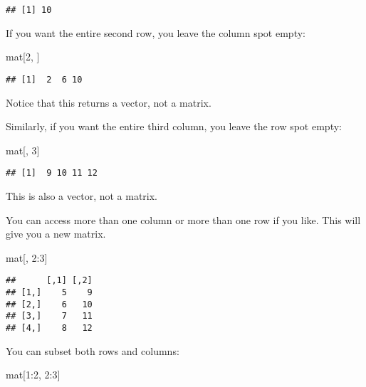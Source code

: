 \documentclass[
]{article}
\newenvironment{Shaded}{\begin{snugshade}}{\end{snugshade}}
\newcommand{\DecValTok}[1]{\textcolor[rgb]{0.00,0.00,0.81}{#1}}
\newcommand{\NormalTok}[1]{#1}
\newcommand{\SpecialCharTok}[1]{\textcolor[rgb]{0.00,0.00,0.00}{#1}}
\begin{document}
\begin{verbatim}
## [1] 10
\end{verbatim}

If you want the entire second row, you leave the column spot empty:

\begin{Shaded}
\begin{Highlighting}[]
\NormalTok{mat[}\DecValTok{2}\NormalTok{, ]}
\end{Highlighting}
\end{Shaded}

\begin{verbatim}
## [1]  2  6 10
\end{verbatim}

Notice that this returns a vector, not a matrix.

Similarly, if you want the entire third column, you leave the row spot
empty:

\begin{Shaded}
\begin{Highlighting}[]
\NormalTok{mat[, }\DecValTok{3}\NormalTok{]}
\end{Highlighting}
\end{Shaded}

\begin{verbatim}
## [1]  9 10 11 12
\end{verbatim}

This is also a vector, not a matrix.

You can access more than one column or more than one row if you like.
This will give you a new matrix.

\begin{Shaded}
\begin{Highlighting}[]
\NormalTok{mat[, }\DecValTok{2}\SpecialCharTok{:}\DecValTok{3}\NormalTok{]}
\end{Highlighting}
\end{Shaded}

\begin{verbatim}
##      [,1] [,2]
## [1,]    5    9
## [2,]    6   10
## [3,]    7   11
## [4,]    8   12
\end{verbatim}

You can subset both rows and columns:

\begin{Shaded}
\begin{Highlighting}[]
\NormalTok{mat[}\DecValTok{1}\SpecialCharTok{:}\DecValTok{2}\NormalTok{, }\DecValTok{2}\SpecialCharTok{:}\DecValTok{3}\NormalTok{]}
\end{Highlighting}
\end{Shaded}
\end{document}
